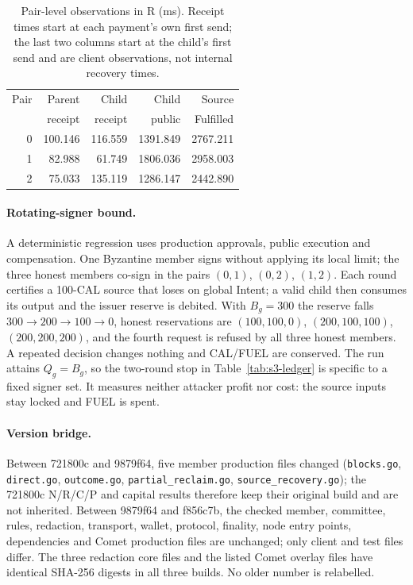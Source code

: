 \begin{table}[htbp]
\caption{Pair-level observations in R (ms). Receipt times start at each payment's own
first send; the last two columns start at the child's first send and are client
observations, not internal recovery times.}
\label{tab:sup-r}
\centering\small
\begin{tabular}{@{}rrrrr@{}}
\hline
Pair & Parent & Child & Child & Source \\
 & receipt & receipt & public & Fulfilled \\
\hline
0 & 100.146 & 116.559 & 1391.849 & 2767.211 \\
1 &  82.988 &  61.749 & 1806.036 & 2958.003 \\
2 &  75.033 & 135.119 & 1286.147 & 2442.890 \\
\hline
\end{tabular}
\end{table}

\paragraph{Rotating-signer bound.}
A deterministic regression uses production approvals, public execution and
compensation. One Byzantine member signs without applying its local limit; the three
honest members co-sign in the pairs $(0,1)$, $(0,2)$, $(1,2)$. Each round certifies a
100-CAL source that loses on global Intent; a valid child then consumes its output and
the issuer reserve is debited. With $B_g=300$ the reserve falls $300\to200\to100\to0$,
honest reservations are $(100,100,0)$, $(200,100,100)$, $(200,200,200)$, and the fourth
request is refused by all three honest members. A repeated decision changes nothing and
CAL/FUEL are conserved. The run attains $Q_g=B_g$, so the two-round stop in
Table~\ref{tab:s3-ledger} is specific to a fixed signer set. It measures neither attacker profit nor
cost: the source inputs stay locked and FUEL is spent.

\paragraph{Version bridge.}
Between 721800c and 9879f64, five member production files changed
(\texttt{blocks.go}, \texttt{direct.go}, \texttt{outcome.go}, \texttt{partial\_reclaim.go},
\texttt{source\_recovery.go}); the 721800c N/R/C/P and capital results therefore keep their
original build and are not inherited. Between 9879f64 and f856c7b, the checked member,
committee, rules, redaction, transport, wallet, protocol, finality, node entry points, dependencies and Comet production
files are unchanged; only client and test files differ. The three redaction core files and
the listed Comet overlay files have identical SHA-256 digests in all three builds. No
older number is relabelled.

